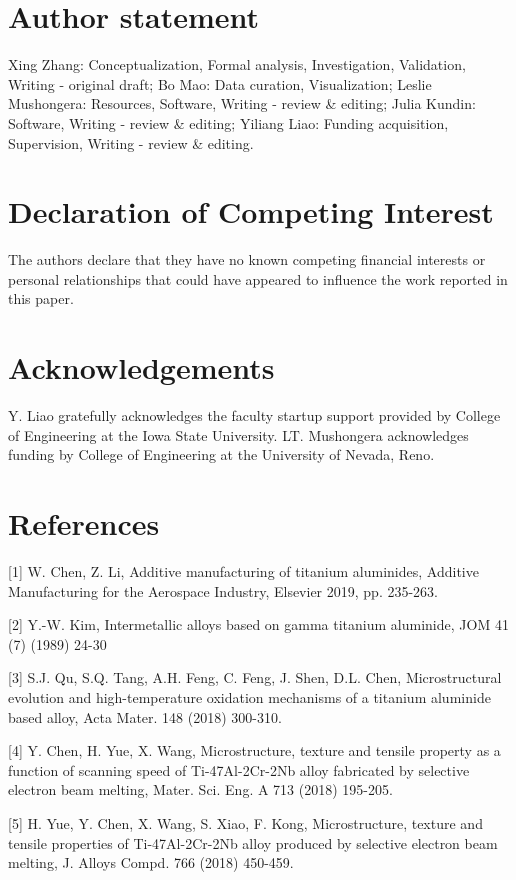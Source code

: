 \documentclass[10pt]{article}
\begin{document}
\section*{Author statement}
Xing Zhang: Conceptualization, Formal analysis, Investigation, Validation, Writing - original draft; Bo Mao: Data curation, Visualization; Leslie Mushongera: Resources, Software, Writing - review \& editing; Julia Kundin: Software, Writing - review \& editing; Yiliang Liao: Funding acquisition, Supervision, Writing - review \& editing.

\section*{Declaration of Competing Interest}
The authors declare that they have no known competing financial interests or personal relationships that could have appeared to influence the work reported in this paper.

\section*{Acknowledgements}
Y. Liao gratefully acknowledges the faculty startup support provided by College of Engineering at the Iowa State University. LT. Mushongera acknowledges funding by College of Engineering at the University of Nevada, Reno.

\section*{References}
[1] W. Chen, Z. Li, Additive manufacturing of titanium aluminides, Additive Manufacturing for the Aerospace Industry, Elsevier 2019, pp. 235-263.

[2] Y.-W. Kim, Intermetallic alloys based on gamma titanium aluminide, JOM 41 (7) (1989) 24-30

[3] S.J. Qu, S.Q. Tang, A.H. Feng, C. Feng, J. Shen, D.L. Chen, Microstructural evolution and high-temperature oxidation mechanisms of a titanium aluminide based alloy, Acta Mater. 148 (2018) 300-310.

[4] Y. Chen, H. Yue, X. Wang, Microstructure, texture and tensile property as a function of scanning speed of Ti-47Al-2Cr-2Nb alloy fabricated by selective electron beam melting, Mater. Sci. Eng. A 713 (2018) 195-205.

[5] H. Yue, Y. Chen, X. Wang, S. Xiao, F. Kong, Microstructure, texture and tensile properties of Ti-47Al-2Cr-2Nb alloy produced by selective electron beam melting, J. Alloys Compd. 766 (2018) 450-459.
\end{document}
